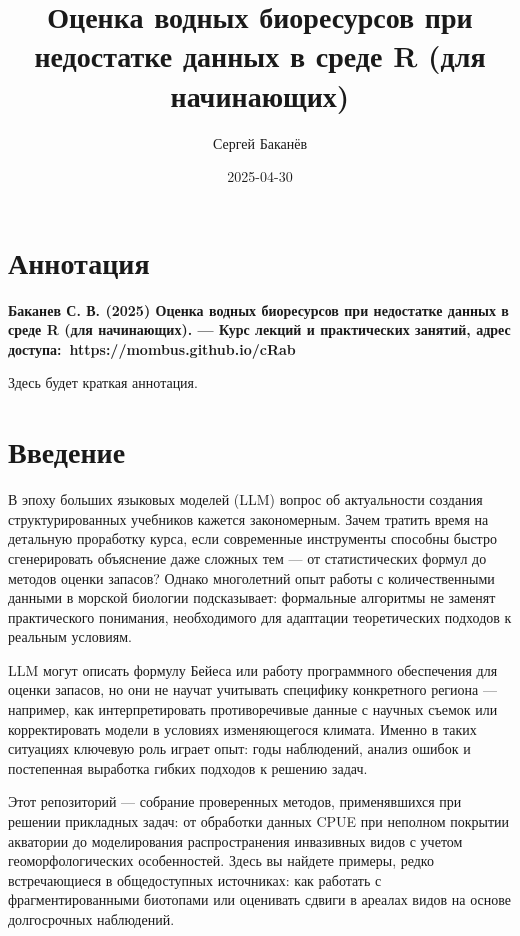 \documentclass[
  letterpaper,
  DIV=11,
  numbers=noendperiod]{scrreprt}
\title{Оценка водных биоресурсов при недостатке данных в среде R (для
начинающих)}
\author{Сергей Баканёв}
\date{2025-04-30}
\renewcommand*\contentsname{Table of contents}
\newcommand\contentsname{Table of contents}
\begin{document}
\maketitle

\renewcommand*\contentsname{Table of contents}
{
\hypersetup{linkcolor=}
\setcounter{tocdepth}{2}
\tableofcontents
}


\chapter*{Аннотация}\label{ux430ux43dux43dux43eux442ux430ux446ux438ux44f}


\textbf{Баканев С. В. (2025) Оценка водных биоресурсов при недостатке
данных в среде R (для начинающих). --- Курс лекций и практических
занятий, адрес доступа:~https://mombus.github.io/cRab}

Здесь будет краткая аннотация.


\chapter{Введение}\label{ux432ux432ux435ux434ux435ux43dux438ux435}

В эпоху больших языковых моделей (LLM) вопрос об актуальности создания
структурированных учебников кажется закономерным. Зачем тратить время на
детальную проработку курса, если современные инструменты способны быстро
сгенерировать объяснение даже сложных тем --- от статистических формул
до методов оценки запасов? Однако многолетний опыт работы с
количественными данными в морской биологии подсказывает: формальные
алгоритмы не заменят практического понимания, необходимого для адаптации
теоретических подходов к реальным условиям.

LLM могут описать формулу Бейеса или работу программного обеспечения для
оценки запасов, но они не научат учитывать специфику конкретного региона
--- например, как интерпретировать противоречивые данные с научных
съемок или корректировать модели в условиях изменяющегося климата.
Именно в таких ситуациях ключевую роль играет опыт: годы наблюдений,
анализ ошибок и постепенная выработка гибких подходов к решению задач.

Этот репозиторий --- собрание проверенных методов, применявшихся при
решении прикладных задач: от обработки данных CPUE при неполном покрытии
акватории до моделирования распространения инвазивных видов с учетом
геоморфологических особенностей. Здесь вы найдете примеры, редко
встречающиеся в общедоступных источниках: как работать с
фрагментированными биотопами или оценивать сдвиги в ареалах видов на
основе долгосрочных наблюдений.
\end{document}
